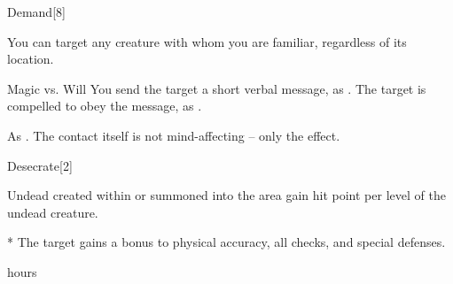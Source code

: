 \begin{spellsection}{Demand}[8]
    \begin{spellheader}
    \end{spellheader}
    \begin{spellcontent}
        \begin{spelltargetinginfo}
        \end{spelltargetinginfo}
        \begin{spelleffects}

            \spellspecial You can target any creature with whom you are familiar, regardless of its location.
            \begin{spellattack}{Magic vs. Will}
                \spelleffect You send the target a short verbal message, as .
                \spellsuccess The target is compelled to obey the message, as .
            \end{spellattack}
        \end{spelleffects}
    \end{spellcontent}
    \begin{spellfooter}
        \spellnotes As .
        \spellnotes The contact itself is not mind-affecting -- only the  effect.
    \end{spellfooter}
\end{spellsection}

\begin{spellsection}{Desecrate}[2]
    \begin{spellheader}
    \end{spellheader}
    \begin{spellcontent}
        \begin{spelltargetinginfo}
        \end{spelltargetinginfo}
        \begin{spelleffects}

            \spellline
            \spelleffect Undead created within or summoned into the area gain  hit point per level of the undead creature.
            \begin{spelltarget}*
                \spelleffect The target gains a  bonus to physical accuracy, all checks, and special defenses.
            \end{spelltarget}
             hours
        \end{spelleffects}
    \end{spellcontent}
    \begin{spellfooter}
    \end{spellfooter}
\end{spellsection}

